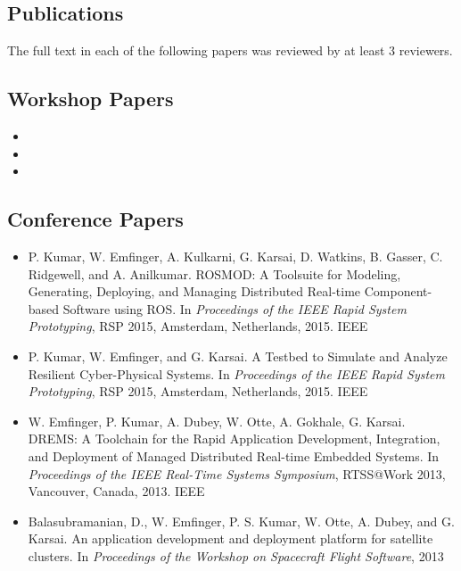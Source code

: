 \begin{appendices}

\chapter{Publications}

\label{ch:publications}

The full text in each of the following papers was reviewed by at least 3 reviewers.

\section{Workshop Papers}
\nobibliography*{}
\begin{itemize}
	\item {}
	\item {}
	\item {}	
\end{itemize}

\section{Conference Papers}
\begin{itemize}
	
	\item P. Kumar, W. Emfinger, A. Kulkarni, G. Karsai, D. Watkins, B. Gasser, C. Ridgewell, and A. Anilkumar. ROSMOD: A Toolsuite for Modeling, Generating, Deploying, and Managing Distributed Real-time Component-based Software using ROS. In \textit{Proceedings of the IEEE Rapid System Prototyping}, RSP 2015, Amsterdam, Netherlands, 2015. IEEE	
	
	\item P. Kumar, W. Emfinger, and G. Karsai. A Testbed to Simulate and Analyze Resilient Cyber-Physical Systems. In \textit{Proceedings of the IEEE Rapid System Prototyping}, RSP 2015, Amsterdam, Netherlands, 2015. IEEE	
	
	\item W. Emfinger, P. Kumar, A. Dubey, W. Otte, A. Gokhale, G. Karsai. DREMS: A Toolchain for the Rapid Application Development, Integration, and Deployment of Managed Distributed Real-time Embedded Systems. In \textit{Proceedings of the IEEE Real-Time Systems Symposium}, RTSS@Work 2013, Vancouver, Canada, 2013. IEEE
	
	\item Balasubramanian, D., W. Emfinger, P. S. Kumar, W. Otte, A. Dubey, and G. Karsai. An application development and deployment platform for satellite clusters.  In \textit { Proceedings of the Workshop on Spacecraft Flight Software}, 2013
	

\end{itemize}
\end{appendices}
